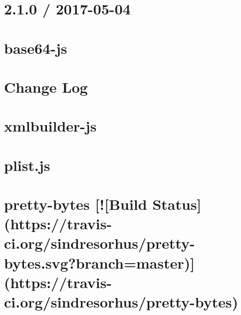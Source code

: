 \documentclass[twoside]{book}
\newcommand{\+}{\discretionary{\mbox{\scriptsize$\hookleftarrow$}}{}{}}
\begin{document}
\chapter{2.1.0 / 2017-\/05-\/04}
\label{md_dsmacc_examples_DRmerge_node_modules_plist_History}

\chapter{base64-\/js}
\label{md_dsmacc_examples_DRmerge_node_modules_plist_node_modules_base64-js_README}

\chapter{Change Log}
\label{md_dsmacc_examples_DRmerge_node_modules_plist_node_modules_xmlbuilder_CHANGELOG}

\chapter{xmlbuilder-\/js}
\label{md_dsmacc_examples_DRmerge_node_modules_plist_node_modules_xmlbuilder_README}

\chapter{plist.\+js}
\label{md_dsmacc_examples_DRmerge_node_modules_plist_README}

\chapter{pretty-\/bytes \mbox{[}!\mbox{[}Build Status\mbox{]}(https\+://travis-\/ci.org/sindresorhus/pretty-\/bytes.svg?branch=master)\mbox{]}(https\+://travis-\/ci.org/sindresorhus/pretty-\/bytes)}
\label{md_dsmacc_examples_DRmerge_node_modules_pretty-bytes_readme}

\end{document}
